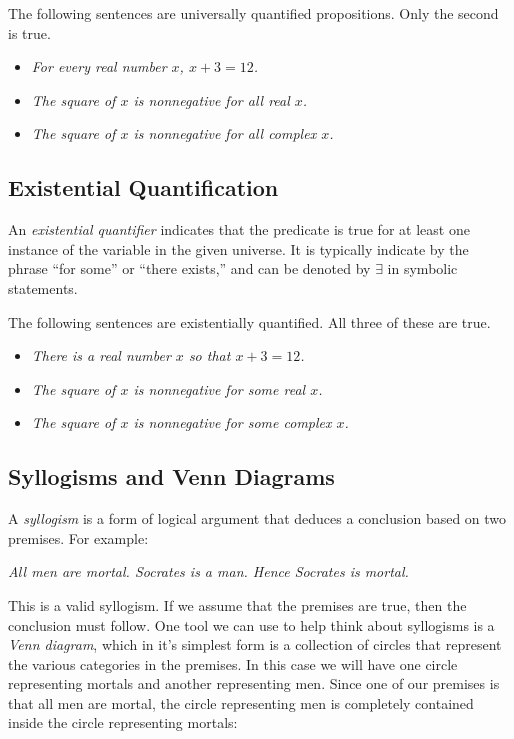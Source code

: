 The following sentences are universally quantified propositions. Only the second is true. 

\begin{itemize}\itemsep0pt
\item \emph{For every real number $x$, $x+3=12$.}
\item \emph{The square of $x$ is nonnegative for all real $x$.}
\item \emph{The square of $x$ is nonnegative for all complex $x$.}
\end{itemize}

\subsection{Existential Quantification}
 
\begin{definition}
An \emph{existential quantifier} indicates that the predicate is true for at least one instance of the variable in the given universe.  It is typically indicate by the phrase ``for some'' or ``there exists,'' and can be denoted by $\exists$ in symbolic statements. 
\end{definition}

The following sentences are existentially quantified. All three of these are true.

\begin{itemize}\itemsep0pt
\item \emph{There is a real number $x$ so that $x+3=12$.}
\item \emph{The square of $x$ is nonnegative for some real $x$.}
\item \emph{The square of $x$ is nonnegative for some complex $x$.}
\end{itemize}

\subsection{Syllogisms and Venn Diagrams}

A \emph{syllogism} is a form of logical argument that deduces a conclusion based on two premises. For example:

\begin{center}
{\slshape All men are mortal. Socrates is a man. Hence Socrates is mortal.}
\end{center}

This is a valid syllogism. If we assume that the premises are true, then the conclusion must follow. One tool we can use to help think about syllogisms is a \emph{Venn diagram}, which in it's simplest form is a collection of circles that represent the various categories in the premises. In this case we will have one circle representing mortals and another representing men. Since one of our premises is that all men are mortal, the circle representing men is completely contained inside the circle representing mortals:

